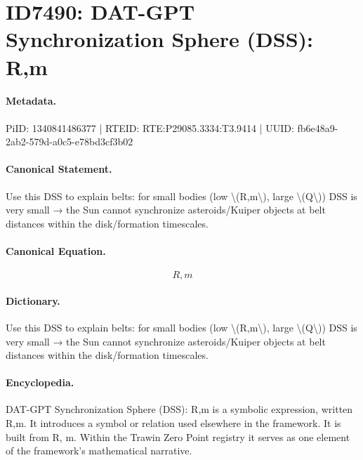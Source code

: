 \section*{ID7490: DAT-GPT Synchronization Sphere (DSS): R,m}
\paragraph{Metadata.}
PiID: 1340841486377 | RTEID: RTE:P29085.3334:T3.9414 | UUID: fb6e48a9-2ab2-579d-a0c5-e78bd3cf3b02

\paragraph{Canonical Statement.}
Use this DSS to explain belts: for small bodies (low \textbackslash{}(R,m\textbackslash{}), large \textbackslash{}(Q\textbackslash{})) DSS is very small → the Sun cannot synchronize asteroids/Kuiper objects at belt distances within the disk/formation timescales.

\paragraph{Canonical Equation.}
\[
R,m
\]

\paragraph{Dictionary.}
Use this DSS to explain belts: for small bodies (low \textbackslash{}(R,m\textbackslash{}), large \textbackslash{}(Q\textbackslash{})) DSS is very small → the Sun cannot synchronize asteroids/Kuiper objects at belt distances within the disk/formation timescales.

\paragraph{Encyclopedia.}
DAT-GPT Synchronization Sphere (DSS): R,m is a symbolic expression, written R,m. It introduces a symbol or relation used elsewhere in the framework. It is built from R, m. Within the Trawin Zero Point registry it serves as one element of the framework's mathematical narrative.
